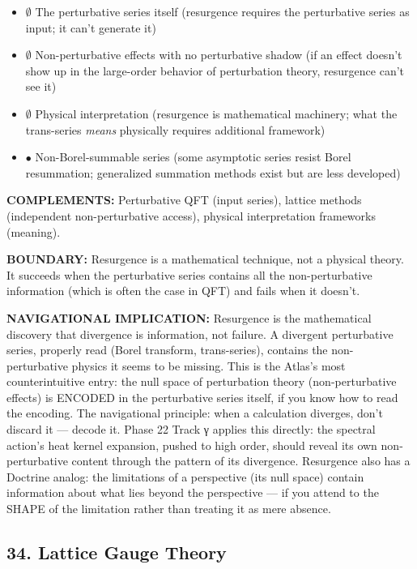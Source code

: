 \begin{itemize}[nosep,leftmargin=*]
  \item $\emptyset$ The perturbative series itself (resurgence requires the perturbative series as input; it can't generate it)
  \item $\emptyset$ Non-perturbative effects with no perturbative shadow (if an effect doesn't show up in the large-order behavior of perturbation theory, resurgence can't see it)
  \item $\emptyset$ Physical interpretation (resurgence is mathematical machinery; what the trans-series \textit{means} physically requires additional framework)
  \item $\bullet$ Non-Borel-summable series (some asymptotic series resist Borel resummation; generalized summation methods exist but are less developed)
\end{itemize}


\textbf{COMPLEMENTS:} Perturbative QFT (input series), lattice methods (independent non-perturbative access), physical interpretation frameworks (meaning).


\textbf{BOUNDARY:} Resurgence is a mathematical technique, not a physical theory. It succeeds when the perturbative series contains all the non-perturbative information (which is often the case in QFT) and fails when it doesn't.


\textbf{NAVIGATIONAL IMPLICATION:} Resurgence is the mathematical discovery that divergence is information, not failure. A divergent perturbative series, properly read (Borel transform, trans-series), contains the non-perturbative physics it seems to be missing. This is the Atlas's most counterintuitive entry: the null space of perturbation theory (non-perturbative effects) is ENCODED in the perturbative series itself, if you know how to read the encoding. The navigational principle: when a calculation diverges, don't discard it — decode it. Phase 22 Track γ applies this directly: the spectral action's heat kernel expansion, pushed to high order, should reveal its own non-perturbative content through the pattern of its divergence. Resurgence also has a Doctrine analog: the limitations of a perspective (its null space) contain information about what lies beyond the perspective — if you attend to the SHAPE of the limitation rather than treating it as mere absence.


\bigskip\noindent\makebox[\textwidth]{\color{rulegray}\rule{5cm}{0.3pt}}\bigskip


\subsection*{34. Lattice Gauge Theory}


